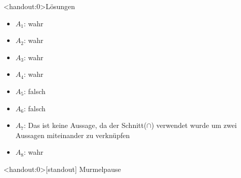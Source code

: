 {
\begin{frame}<handout:0>{Lösungen}
  \begin{itemize}[<+- | alert@+>]
        \item
            $A_1$: wahr
        \item
            $A_2$: wahr
        \item
            $A_3$: wahr
        \item
            $A_4$: wahr
        \item
            $A_5$: falsch
       	\item
       		$A_6$: falsch
        \item
            $A_7$: Das ist keine Aussage, da der Schnitt($\cap$) verwendet wurde um zwei Aussagen miteinander zu verknüpfen
       	\item
       		$A_8$: wahr
    \end{itemize}
\end{frame}
}

\begin{frame}<handout:0>[standout]
    Murmelpause
\end{frame}





